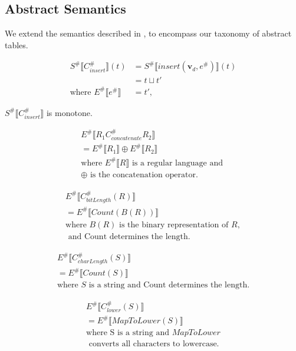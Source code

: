 \subsection{Abstract Semantics}

We extend the semantics described in \cite{halder_abstract_2012}, to encompass our taxonomy of abstract tables.

\begin{align*}
    S^\# \llbracket C_{insert}^\# \rrbracket (t) &= S^\# \llbracket insert(\mathbf{v}_d, e^\#) \rrbracket (t) \\
    &= t \sqcup t' \\
    \text{where } E^\# \llbracket e^\# \rrbracket &= t',
\end{align*}

\begin{lemma}
    $S^\# \llbracket C_{insert}^\# \rrbracket$ is monotone.
\end{lemma}

\begin{align*}
    E^\# \llbracket R_1 C_{concatenate}^\# R_2 \rrbracket \\
    = E^\# \llbracket R_1 \rrbracket \oplus  E^\# \llbracket R_2 \rrbracket \\
    \text{where } E^\# \llbracket R \rrbracket \text{ is a regular language and }\\
     \oplus \text{ is the concatenation operator.}
\end{align*}

\begin{align*}
    E^\# \llbracket C_{bitLength}^\# (R) \rrbracket \\
    = E^\# \llbracket Count(B(R)) \rrbracket \\
    \text{where } B(R) \text{ is the binary representation of }R, \\ \text{ and Count determines the length.}
\end{align*}

\begin{align*}
    E^\# \llbracket C_{charLength}^\# (S) \rrbracket \\
    = E^\# \llbracket Count(S) \rrbracket \\
    \text{where } S \text{ is a string and Count determines the length.} 
\end{align*}

\begin{align*}
    E^\# \llbracket C_{lower}^\# (S) \rrbracket \\
    = E^\# \llbracket MapToLower (S) \rrbracket \\
    \text{where S is a string and } MapToLower \\
    \text{ converts all characters to lowercase.}
\end{align*}

